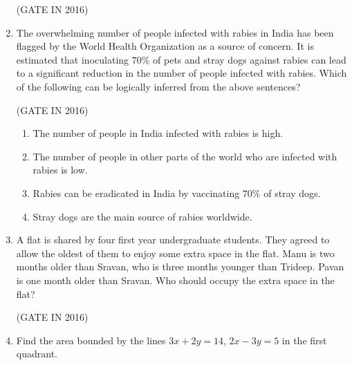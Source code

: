 \documentclass[journal,12pt,onecolumn]{IEEEtran}
\theoremstyle{remark}
\begin{document}
\begin{enumerate}
\hfill{(GATE IN 2016)}
\begin{enumerate}
\end{enumerate}

\item The overwhelming number of people infected with rabies in India has been flagged by the World Health Organization as a source of concern. It is estimated that inoculating $70\%$ of pets and stray dogs against rabies can lead to a significant reduction in the number of people infected with rabies.
Which of the following can be logically inferred from the above sentences?

\hfill{(GATE IN 2016)}
\begin{enumerate}
\item The number of people in India infected with rabies is high.
\item The number of people in other parts of the world who are infected with rabies is low.
\item Rabies can be eradicated in India by vaccinating $70\%$ of stray dogs.
\item Stray dogs are the main source of rabies worldwide.
\end{enumerate}

\item A flat is shared by four first year undergraduate students. They agreed to allow the oldest of them to enjoy some extra space in the flat. Manu is two months older than Sravan, who is three months younger than Trideep. Pavan is one month older than Sravan. Who should occupy the extra space in the flat?

\hfill{(GATE IN 2016)}
\begin{enumerate}
\end{enumerate}

\item Find the area bounded by the lines $3x+2y=14$, $2x-3y=5$ in the first quadrant.


\end{enumerate}
\end{document}
